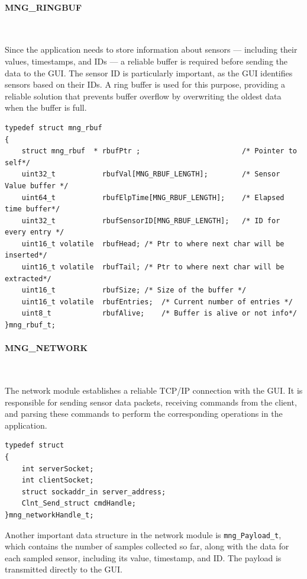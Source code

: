 \documentclass{article}
\begin{document}
\newpage
\paragraph{MNG\_RINGBUF}\

Since the application needs to store information about sensors — including their values, 
timestamps, and IDs — a reliable buffer is required before sending the data to the GUI. 
The sensor ID is particularly important, as the GUI identifies sensors based on their 
IDs. A ring buffer is used for this purpose, providing a reliable solution that prevents 
buffer overflow by overwriting the oldest data when the buffer is full.

\begin{lstlisting}[caption={MNG Ring Buffer handle structure}, label={lst:rbufhandle}]
typedef struct mng_rbuf
{
    struct mng_rbuf  * rbufPtr ;                        /* Pointer to self*/
    uint32_t           rbufVal[MNG_RBUF_LENGTH];        /* Sensor Value buffer */
    uint64_t           rbufElpTime[MNG_RBUF_LENGTH];    /* Elapsed time buffer*/
    uint32_t           rbufSensorID[MNG_RBUF_LENGTH];   /* ID for every entry */   
    uint16_t volatile  rbufHead; /* Ptr to where next char will be inserted*/
    uint16_t volatile  rbufTail; /* Ptr to where next char will be extracted*/
    uint16_t           rbufSize; /* Size of the buffer */
    uint16_t volatile  rbufEntries;  /* Current number of entries */
    uint8_t            rbufAlive;    /* Buffer is alive or not info*/
}mng_rbuf_t;
\end{lstlisting}



\paragraph{MNG\_NETWORK}\

The network module establishes a reliable TCP/IP connection with the GUI. It is 
responsible for sending sensor data packets, receiving commands from the client, and 
parsing these commands to perform the corresponding operations in the application.


\begin{lstlisting}[caption={MNG Network handle structure}, label={lst:networkhandle}]
typedef struct
{
    int serverSocket;
    int clientSocket;
    struct sockaddr_in server_address;
    Clnt_Send_struct cmdHandle;
}mng_networkHandle_t;
\end{lstlisting}

Another important data structure in the network module is \texttt{mng\_Payload\_t}, which 
contains the number of samples collected so far, along with the data for each sampled 
sensor, including its value, timestamp, and ID. The payload is transmitted directly to the GUI.
\end{document}

